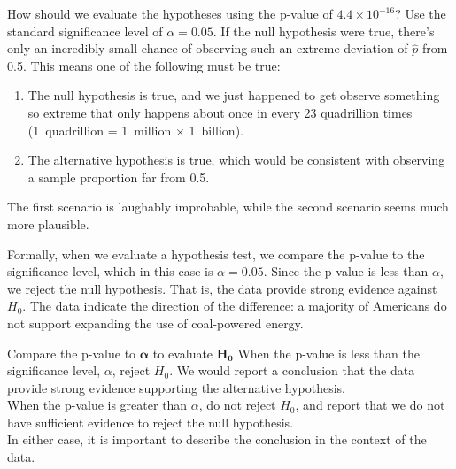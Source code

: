 \begin{examplewrap}
\begin{nexample}{How should we evaluate the hypotheses using the
    p-value of $4.4 \times 10^{-16}$?
    Use the standard significance level of $\alpha = 0.05$.}
  If the null hypothesis were true, there's only an incredibly
  small chance of observing such an extreme deviation of
  $\hat{p}$ from 0.5.
  This means one of the following must be true:
  \begin{enumerate}
    \item The null hypothesis is true, and we just happened
        to get observe something so extreme that only happens
        about once in every 23 quadrillion times
        (1~quadrillion = 1~million $\times$ 1~billion).
    \item The alternative hypothesis is true,
        which would be consistent
        with observing a sample proportion far from 0.5.
  \end{enumerate}
  The first scenario is laughably improbable,
  while the second scenario seems much more plausible.

  Formally, when we evaluate a hypothesis test,
  we compare the p-value to the significance level,
  which in this case is $\alpha = 0.05$.
  Since the p-value is less than $\alpha$,
  we reject the null hypothesis.
  That is, the data provide strong evidence against $H_0$.
  The data indicate the direction of the difference:
  a majority of Americans do not support
  expanding the use of coal-powered energy.
\end{nexample}
\end{examplewrap}


\begin{onebox}{Compare the p-value to $\pmb{\alpha}$ to
      evaluate $\pmb{H_0}$}
  When the p-value is less than the significance level, $\alpha$,
  reject $H_0$. We would report a conclusion that the data provide
  strong evidence supporting the alternative hypothesis. \\[2mm]
  When the p-value is greater than $\alpha$, do not reject $H_0$,
  and report that we do not have sufficient evidence to reject the
  null hypothesis. \\[2mm]
  In either case, it is important to describe the conclusion
  in the context of the data.
\end{onebox}







